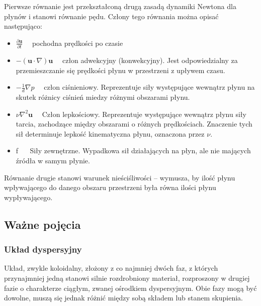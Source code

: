 \documentclass{article}
\begin{document}
	\medskip
	\medskip
	\noindent Pierwsze równanie jest przekształconą drugą zasadą dynamiki Newtona dla płynów i stanowi równanie pędu. Człony tego równania można opisać następująco:
	\begin{itemize}
		\item \( \frac{\partial \mathbf{u}}{\partial t} \quad \) pochodna prędkości po czasie
		
		\item \( -(\mathbf{u} \cdot \nabla) \mathbf{u} \quad \) człon adwekcyjny (konwekcyjny). Jest odpowiedzialny za przemieszczanie się prędkości płynu w przestrzeni z upływem czasu.
		
		\item \( -\frac{1}{d} \nabla p \quad \) człon ciśnieniowy. Reprezentuje siły występujące wewnątrz płynu na skutek różnicy ciśnień miedzy różnymi obszarami płynu.
		
		\item \( \nu \nabla^{2} \mathbf{u} \quad \) Człon lepkościowy. Reprezentuje występujące wewnątrz płynu siły tarcia, zachodzące między obszarami o różnych prędkościach. Znaczenie tych sił determinuje lepkość kinematyczna płynu, oznaczona przez \( \nu . \)
		
		\item f \( \quad \) Siły zewnętrzne. Wypadkowa sił działających na płyn, ale nie mających źródła w samym płynie.
	\end{itemize}
	
	\medskip
	\medskip
	\noindent Równanie drugie stanowi warunek nieściśliwości – wymusza, by ilość płynu wpływającego do danego obszaru przestrzeni była równa ilości płynu wypływającego.
	
	\vspace{7mm}
	\subsection{Ważne pojęcia}
	\vspace{3mm}
	\renewcommand*\thesubsubsection{}
	\subsubsection{Układ dyspersyjny} 
	Układ, zwykle koloidalny, złożony z co najmniej dwóch faz, z których przynajmniej jedną stanowi silnie rozdrobniony materiał, rozproszony w drugiej fazie o charakterze ciągłym, zwanej ośrodkiem dyspersyjnym. Obie fazy mogą być dowolne, muszą się jednak różnić między sobą składem lub stanem skupienia.
	
\end{document}
